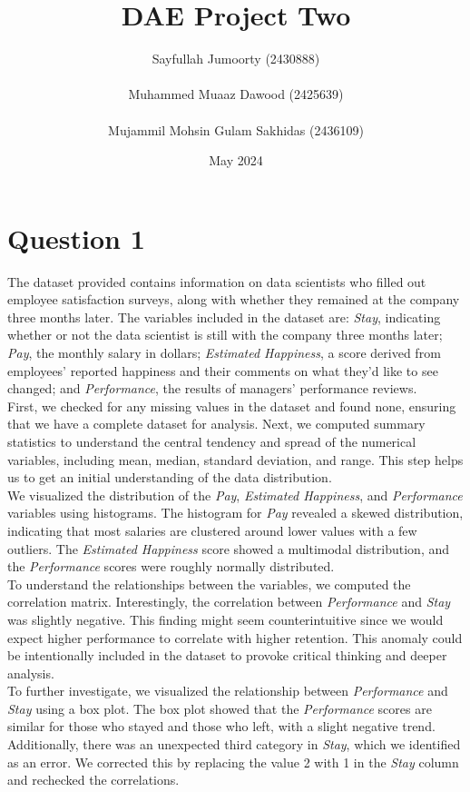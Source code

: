 \documentclass{article}
\title{DAE Project Two}
\author{
Sayfullah Jumoorty (2430888)
\\ \\
Muhammed Muaaz Dawood (2425639)
\\ \\
Mujammil Mohsin Gulam Sakhidas (2436109)
}
\date{May 2024}
\begin{document}
\maketitle

\section*{Question 1}

The dataset provided contains information on data scientists who filled out employee satisfaction surveys, along with whether they remained at the company three months later. The variables included in the dataset are: \textit{Stay}, indicating whether or not the data scientist is still with the company three months later; \textit{Pay}, the monthly salary in dollars; \textit{Estimated Happiness}, a score derived from employees' reported happiness and their comments on what they'd like to see changed; and \textit{Performance}, the results of managers' performance reviews.
\\
First, we checked for any missing values in the dataset and found none, ensuring that we have a complete dataset for analysis. Next, we computed summary statistics to understand the central tendency and spread of the numerical variables, including mean, median, standard deviation, and range. This step helps us to get an initial understanding of the data distribution.
\\
We visualized the distribution of the \textit{Pay}, \textit{Estimated Happiness}, and \textit{Performance} variables using histograms. The histogram for \textit{Pay} revealed a skewed distribution, indicating that most salaries are clustered around lower values with a few outliers. The \textit{Estimated Happiness} score showed a multimodal distribution, and the \textit{Performance} scores were roughly normally distributed.
\\
To understand the relationships between the variables, we computed the correlation matrix. Interestingly, the correlation between \textit{Performance} and \textit{Stay} was slightly negative. This finding might seem counterintuitive since we would expect higher performance to correlate with higher retention. This anomaly could be intentionally included in the dataset to provoke critical thinking and deeper analysis.
\\
To further investigate, we visualized the relationship between \textit{Performance} and \textit{Stay} using a box plot. The box plot showed that the \textit{Performance} scores are similar for those who stayed and those who left, with a slight negative trend. Additionally, there was an unexpected third category in \textit{Stay}, which we identified as an error. We corrected this by replacing the value 2 with 1 in the \textit{Stay} column and rechecked the correlations.
\end{document}
